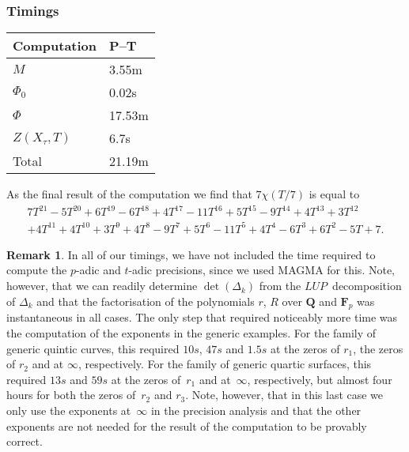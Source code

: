 \documentclass[a4paper,11pt]{article}
\numberwithin{equation}{section}
\newcommand{\QQ}{\mathbf{Q}} %
\newcommand{\FF}{\mathbf{F}} %
\theoremstyle{definition}
\newtheorem{rem}[thm]{Remark}
\begin{document}
\subsubsection{Timings}

\begin{center}
\begin{tabular}{l l} \toprule
Computation     & P--T \\ \midrule
$M$             & 3.55m     \\
$\Phi_0$        & 0.02s     \\
$\Phi$          & 17.53m     \\
$Z(X_{\tau},T)$ & 6.7s     \\
Total           & 21.19m     \\ \bottomrule
\end{tabular}
\end{center}

As the final result of the computation we find that $7 \chi(T/7)$ is equal to 
\begin{multline*}
7T^{21} - 5T^{20} + 6T^{19} - 6T^{18} + 4T^{17} - 11T^{16} + 5T^{15} - 9T^{14} + 4T^{13} + 3T^{12} \\
+4T^{11} + 4T^{10} + 3T^9 + 4T^8 - 9T^7 + 5T^6 - 11T^5 + 4T^4 - 6T^3 + 6T^2 - 5T + 7.
\end{multline*}

\begin{rem}
In all of our timings, we have not included the time required to compute 
the $p$-adic and $t$-adic precisions, since we used MAGMA for this. Note, 
however, that we can readily determine $\det(\Delta_k)$ from the 
$LUP$~decomposition of $\Delta_k$ and that the factorisation of the 
polynomials $r$, $R$ over $\QQ$ and $\FF_p$ was instantaneous in all 
cases. The only step that required noticeably more time was the 
computation of the exponents in the generic examples. For the family of 
generic quintic curves, this required $10s$, $47s$ and $1.5s$ at the 
zeros of $r_1$, the zeros of $r_2$ and at $\infty$, respectively. For the 
family of generic quartic surfaces, this required $13s$ and $59s$ at the 
zeros of~$r_1$ and at~$\infty$, respectively, but almost four hours for 
both the zeros of~$r_2$ and $r_3$.  Note, however, that in this last case 
we only use the exponents at~$\infty$ in the precision analysis and that
the other exponents are not needed for the result of the computation to
be provably correct.
\end{rem}




\end{document}

